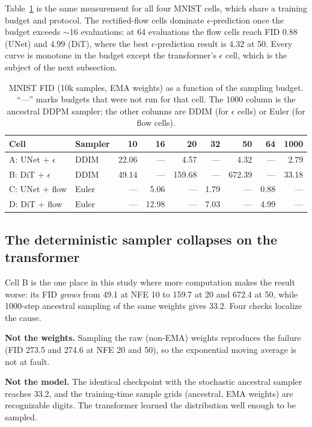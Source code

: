 \documentclass{article}
\begin{document}
Table~\ref{tab:mnist-nfe} is the same measurement for all four MNIST cells, which share a
training budget and protocol. The rectified-flow cells dominate $\epsilon$-prediction once the
budget exceeds $\sim$16 evaluations: at 64 evaluations the flow cells reach FID $0.88$ (UNet)
and $4.99$ (DiT), where the best $\epsilon$-prediction result is $4.32$ at 50. Every curve is
monotone in the budget except the transformer's $\epsilon$ cell, which is the subject of the
next subsection.

\begin{table}[t]
  \caption{MNIST FID (10k samples, EMA weights) as a function of the sampling budget.
  ``---'' marks budgets that were not run for that cell. The 1000 column is the ancestral
  DDPM sampler; the other columns are DDIM (for $\epsilon$ cells) or Euler (for flow cells).}
  \label{tab:mnist-nfe}
  \centering
  \small
  \begin{tabular}{@{}llrrrrrrr@{}}
    \toprule
    Cell & Sampler & 10 & 16 & 20 & 32 & 50 & 64 & 1000 \\
    \midrule
    A: UNet $+$ $\epsilon$ & DDIM  & 22.06 & --- & 4.57 & --- & 4.32 & --- & 2.79 \\
    B: DiT $+$ $\epsilon$  & DDIM  & 49.14 & --- & 159.68 & --- & 672.39 & --- & 33.18 \\
    C: UNet $+$ flow       & Euler & --- & 5.06 & --- & 1.79 & --- & 0.88 & --- \\
    D: DiT $+$ flow        & Euler & --- & 12.98 & --- & 7.03 & --- & 4.99 & --- \\
    \bottomrule
  \end{tabular}
\end{table}

\subsection{The deterministic sampler collapses on the transformer}

Cell B is the one place in this study where more computation makes the result worse: its FID
\emph{grows} from 49.1 at NFE 10 to 159.7 at 20 and 672.4 at 50, while 1000-step ancestral
sampling of the same weights gives 33.2. Four checks localize the cause.

\textbf{Not the weights.} Sampling the raw (non-EMA) weights reproduces the failure
(FID 273.5 and 274.6 at NFE 20 and 50), so the exponential moving average is not at fault.

\textbf{Not the model.} The identical checkpoint with the stochastic ancestral sampler
reaches 33.2, and the training-time sample grids (ancestral, EMA weights) are recognizable
digits. The transformer learned the distribution well enough to be sampled.
\end{document}
